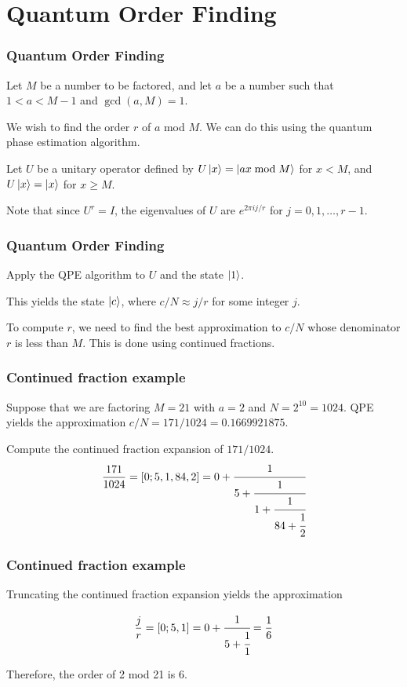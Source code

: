 \documentclass{beamer}
\begin{document}
\section*{Quantum Order Finding}

\begin{frame}
    \frametitle{Quantum Order Finding}

    Let $M$ be a number to be factored, and let $a$ be a number 
    such that $1 < a < M - 1$ and $\gcd(a, M) = 1$.

    \vspace{0.5cm}

    We wish to find the order $r$ of $a$ mod $M$.
    We can do this using the quantum phase estimation algorithm.

   \vspace{0.5cm}

   Let $U$ be a unitary operator defined by $U\left| x \right\rangle = \left| ax \bmod M \right\rangle$ 
   for $x < M$, and $U\left| x \right\rangle = \left| x \right\rangle$ for $x \geq M$.

   \vspace{0.5cm}

   Note that since $U^r = I$, the eigenvalues of $U$ are $e^{2\pi i j / r}$ 
   for $j = 0, 1, \ldots, r-1$.
 
\end{frame}



\begin{frame}
    \frametitle{Quantum Order Finding}

   Apply the QPE algorithm to $U$ and the state $\left| 1 \right\rangle$.

   This yields the state $\left| c \right\rangle$, where $c/N \approx j/r$
    for some integer $j$.

    \vspace{0.5cm}

    To compute $r$, we need to find the best approximation to $c/N$
    whose denominator $r$ is less than $M$. This is done using continued fractions.


\end{frame}

\begin{frame}
    \frametitle{Continued fraction example}

    Suppose that we are factoring $M = 21$ with $a=2$ and $N = 2^10 = 1024$.
    QPE yields the approximation $c/N = 171/1024 = 0.1669921875$.
    
    Compute the continued fraction expansion of $171/1024$.
    $$\frac{171}{1024} = [0; 5, 1, 84, 2] = 0 + \cfrac{1}{5 + 
    \cfrac{1}{1 + \cfrac{1}{84 + \cfrac{1}{2}}}}$$
\end{frame}



\begin{frame}
    \frametitle{Continued fraction example}
    Truncating the continued fraction expansion yields the approximation

    $$\frac{j}{r} = [0; 5, 1] = 0 + \cfrac{1}{5 + \cfrac{1}{1}} = \frac{1}{6}$$

    Therefore, the order of 2 mod 21 is 6.

\end{frame}
\end{document}
